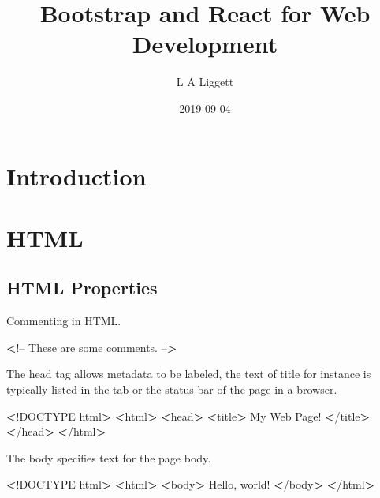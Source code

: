 \documentclass[]{book}
\title{Bootstrap and React for Web Development}
\author{L A Liggett}
\date{2019-09-04}
\newenvironment{Shaded}{\begin{snugshade}}{\end{snugshade}}
\newcommand{\FunctionTok}[1]{\textcolor[rgb]{0.00,0.00,0.00}{#1}}
\newcommand{\OperatorTok}[1]{\textcolor[rgb]{0.81,0.36,0.00}{\textbf{#1}}}
\newcommand{\ExtensionTok}[1]{#1}
\newcommand{\NormalTok}[1]{#1}
\begin{document}
\maketitle

{
\setcounter{tocdepth}{1}
\tableofcontents
}
\chapter{Introduction}\label{introduction}

\chapter{HTML}\label{html}

\section{HTML Properties}\label{html-properties}

Commenting in HTML.

\begin{Shaded}
\begin{Highlighting}[]
\OperatorTok{<}\NormalTok{!}\ExtensionTok{--}
\ExtensionTok{These}\NormalTok{ are some comments.}
\ExtensionTok{--}\OperatorTok{>}
\end{Highlighting}
\end{Shaded}

The head tag allows metadata to be labeled, the text of title for
instance is typically listed in the tab or the status bar of the page in
a browser.

\begin{Shaded}
\begin{Highlighting}[]
\OperatorTok{<}\NormalTok{!}\ExtensionTok{DOCTYPE}\NormalTok{ html}\OperatorTok{>}         
\OperatorTok{<}\ExtensionTok{html}\OperatorTok{>}                  
    \OperatorTok{<}\FunctionTok{head}\OperatorTok{>}              
        \OperatorTok{<}\ExtensionTok{title}\OperatorTok{>}         
            \ExtensionTok{My}\NormalTok{ Web Page!}
        \OperatorTok{<}\NormalTok{/}\ExtensionTok{title}\OperatorTok{>}        
    \OperatorTok{<}\NormalTok{/}\ExtensionTok{head}\OperatorTok{>}             
\OperatorTok{<}\NormalTok{/}\ExtensionTok{html}\OperatorTok{>}                 
\end{Highlighting}
\end{Shaded}

The body specifies text for the page body.

\begin{Shaded}
\begin{Highlighting}[]
\OperatorTok{<}\NormalTok{!}\ExtensionTok{DOCTYPE}\NormalTok{ html}\OperatorTok{>}         
\OperatorTok{<}\ExtensionTok{html}\OperatorTok{>}                  
    \OperatorTok{<}\ExtensionTok{body}\OperatorTok{>}              
        \ExtensionTok{Hello}\NormalTok{, world!   }
    \OperatorTok{<}\NormalTok{/}\ExtensionTok{body}\OperatorTok{>}             
\OperatorTok{<}\NormalTok{/}\ExtensionTok{html}\OperatorTok{>}                 
\end{Highlighting}
\end{Shaded}
\end{document}
